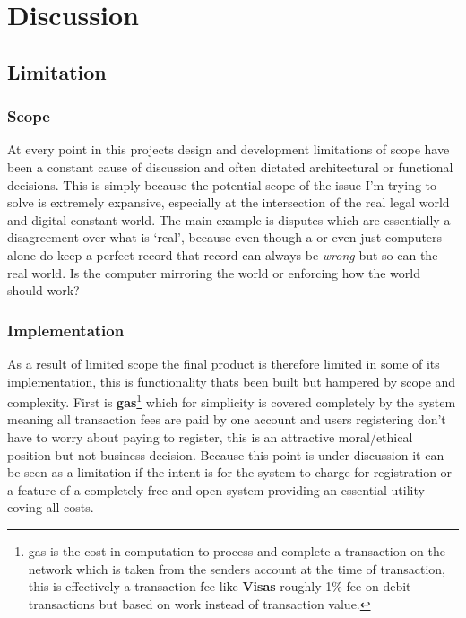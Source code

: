 \section{Discussion}
\subsection{Limitation}

\subsubsection{Scope}

At every point in this projects design and development limitations of scope have been a constant cause of discussion and often dictated architectural or functional decisions. This is simply because the potential scope of the issue I'm trying to solve is extremely expansive, especially at the intersection of the real legal world and digital constant world. The main example is disputes which are essentially a disagreement over what is `real', because even though a  or even just computers alone do keep a perfect record that record can always be \textit{wrong} but so can the real world. Is the computer mirroring the world or enforcing how the world should work?

\subsubsection{Implementation}

As a result of limited scope the final product is therefore limited in some of its implementation, this is functionality thats been built but hampered by scope and complexity. First is \textbf{gas}\footnote{gas is the cost in computation to process and complete a transaction on the  network which is taken from the senders account at the time of transaction, this is effectively a transaction fee like \textbf{Visas} roughly 1\% fee on debit transactions but based on work instead of transaction value.} which for simplicity is covered completely by the system meaning all transaction fees are paid by one account and users registering don't have to worry about paying to register, this is an attractive moral/ethical position but not business decision. Because this point is under discussion it can be seen as a limitation if the intent is for the system to charge for registration or a feature of a completely free and open system providing an essential utility coving all costs.

